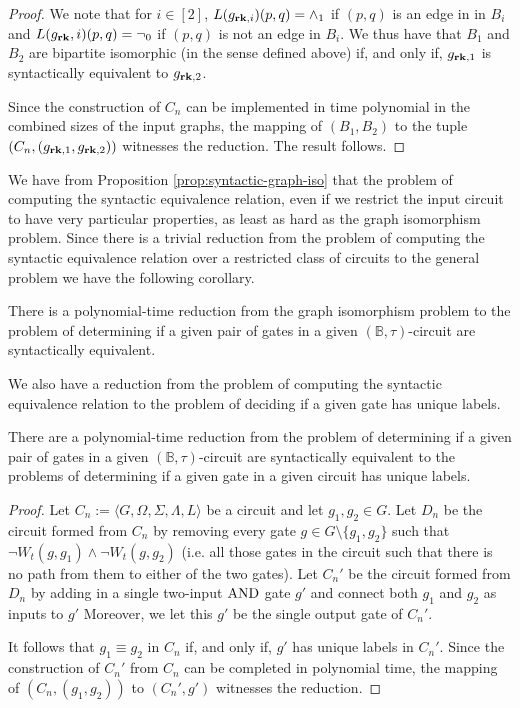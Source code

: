 \documentclass[../paper.tex]{subfiles}
\begin{document}
\begin{proof}
  We note that for $i \in [2]$, $L(g_{\text{\textbf{rk}}, i})(p,q) = \land_1$ if $(p,q)$ is
  an edge in in $B_i$ and $L(g_{\text{\textbf{rk}}}, i)(p,q) = \neg_0$ if $(p,q)$ is not an
  edge in $B_i$. We thus have that $B_1$ and $B_2$ are bipartite isomorphic (in
  the sense defined above) if, and only if, $g_{\text{\textbf{rk}}, 1}$ is syntactically
  equivalent to $g_{\text{\textbf{rk}}, 2}$.

  Since the construction of $C_n$ can be implemented in time polynomial in the
  combined sizes of the input graphs, the mapping of $(B_1, B_2)$ to the tuple
  $(C_n, (g_{\text{\textbf{rk}}, 1}, g_{\text{\textbf{rk}}, 2}))$ witnesses the reduction. The result
  follows.
\end{proof}

We have from Proposition \ref{prop:syntactic-graph-iso} that the problem of
computing the syntactic equivalence relation, even if we restrict the input
circuit to have very particular properties, as least as hard as the graph
isomorphism problem. Since there is a trivial reduction from the problem of
computing the syntactic equivalence relation over a restricted class of circuits
to the general problem we have the following corollary.

\begin{cor}
  There is a polynomial-time reduction from the graph isomorphism problem to the
  problem of determining if a given pair of gates in a given $(\mathbb{B},
  \tau)$-circuit are syntactically equivalent.
  \label{lem:syntactically-equivilent-general-hard}
\end{cor}

We also have a reduction from the problem of computing the syntactic equivalence
relation to the problem of deciding if a given gate has unique labels.

\begin{lem}
  There are a polynomial-time reduction from the problem of determining if a
  given pair of gates in a given $(\mathbb{B}, \tau)$-circuit are syntactically
  equivalent to the problems of determining if a given gate in a given circuit
  has unique labels.
  \label{lem:syntactically-equivalent-unique-labels}
\end{lem}

\begin{proof}
  Let $C_n := \langle G, \Omega, \Sigma, \Lambda, L \rangle$ be a circuit and
  let $g_1, g_2 \in G$. Let $D_n$ be the circuit formed from $C_n$ by removing
  every gate $g \in G \setminus\{g_1, g_2\}$ such that $\neg W_t(g, g_1) \land
  \neg W_t(g, g_2)$ (i.e. all those gates in the circuit such that there is no
  path from them to either of the two gates). Let $C_n'$ be the circuit formed
  from $D_n$ by adding in a single two-input $\text{\upshape AND}$ gate $g'$ and connect both
  $g_1$ and $g_2$ as inputs to $g'$ Moreover, we let this $g'$ be the single
  output gate of $C_n'$.

  It follows that $g_1 \equiv g_2$ in $C_n$ if, and only if, $g'$ has unique
  labels in $C_n'$. Since the construction of $C_n'$ from $C_n$ can be completed
  in polynomial time, the mapping of $(C_n, (g_1, g_2))$ to $(C_n', g')$
  witnesses the reduction.
\end{proof}
\end{document}
